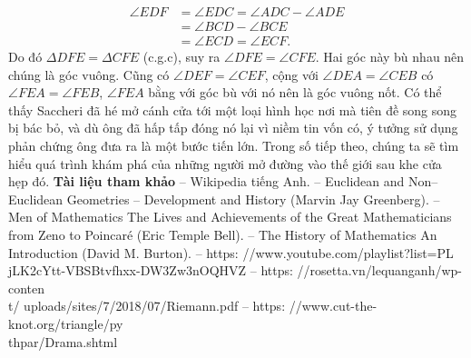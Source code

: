 \begin{multicols}{2}
	\begin{align*}
		\angle EDF &= \angle EDC = \angle ADC - \angle ADE \\
		&= \angle BCD - \angle BCE \\
		&= \angle ECD = \angle ECF.
	\end{align*}
	Do đó $ \Delta DFE = \Delta CFE$ (c.g.c), suy ra $ \angle DFE = \angle CFE$. Hai góc này bù nhau nên chúng là góc vuông.
	Cũng có $ \angle DEF = \angle CEF$, cộng với $ \angle DEA = \angle CEB$ có $ \angle FEA = \angle FEB$, $ \angle FEA$ bằng với góc bù với nó nên là góc vuông nốt.
	\vskip 0.1cm
	Có thể thấy Saccheri đã hé mở cánh cửa tới một loại hình học nơi mà tiên đề song song bị bác bỏ, và dù ông đã hấp tấp đóng nó lại vì niềm tin vốn có, ý tưởng sử dụng phản chứng ông đưa ra là một bước tiến lớn. Trong số tiếp theo, chúng ta sẽ tìm hiểu quá trình khám phá của những người mở đường vào thế giới sau khe cửa hẹp đó. 
	\vskip 0.1cm
	\textbf{\color{lichsutoanhoc}Tài liệu tham khảo}
	\vskip 0.1cm
	-- Wikipedia tiếng Anh.
	\vskip 0.1cm
	-- Euclidean and Non--Euclidean Geometries -- Development and History (Marvin Jay Greenberg).
	\vskip 0.1cm
	-- Men of Mathematics The Lives and Achievements of the Great Mathematicians from Zeno to Poincaré (Eric Temple Bell).
	\vskip 0.1cm
	-- The History of Mathematics An Introduction (David M. Burton).
	\vskip 0.1cm
	-- https: //www.youtube.com/playlist?list=PL\\jLK2cYtt-VBSBtvfhxx-DW3Zw3nOQHVZ
	\vskip 0.1cm
	-- https: //rosetta.vn/lequanganh/wp-conten\\t/
	uploads/sites/7/2018/07/Riemann.pdf
	\vskip 0.1cm
	-- https: //www.cut-the-knot.org/triangle/py\\
	thpar/Drama.shtml
\end{multicols}

